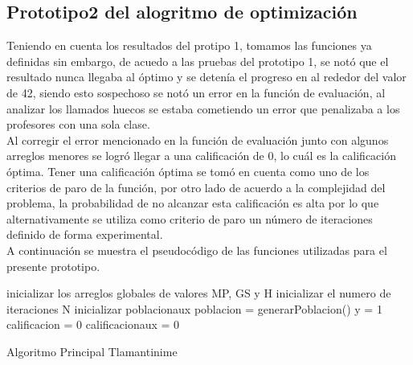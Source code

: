 \subsection{Prototipo2 del alogritmo de optimización}

Teniendo en cuenta los resultados del protipo 1, tomamos las funciones ya definidas sin embargo, de acuedo a las pruebas del prototipo 1, se notó que el resultado nunca llegaba al óptimo y se detenía el progreso en al rededor del valor de 42, siendo esto sospechoso se notó un error en la función de evaluación, al analizar los llamados huecos se estaba cometiendo un error que penalizaba a los profesores con una sola clase.\\

Al corregir el error mencionado en la función de evaluación junto con algunos arreglos menores se logró llegar a una calificación de 0, lo cuál es la calificación óptima. Tener una calificación óptima se tomó en cuenta como uno de los criterios de paro de la función, por otro lado de acuerdo a la complejidad del problema, la probabilidad de no alcanzar esta calificación es alta por lo que alternativamente se utiliza como criterio de paro un número de iteraciones definido de forma experimental.\\

A continuación se muestra el pseudocódigo de las funciones utilizadas para el presente prototipo.

\begin{algorithm}[H]
	\DontPrintSemicolon
	\SetAlgoLined
	inicializar los arreglos globales de valores MP, GS y H\;
	inicializar el numero de iteraciones N\;
	inicializar poblacionaux\;
	poblacion = generarPoblacion()\;
	y = 1\;
	calificacion = 0 \;
	calificacionaux = 0 \;
	
	\caption{Algoritmo Principal Tlamantinime}
\end{algorithm}


